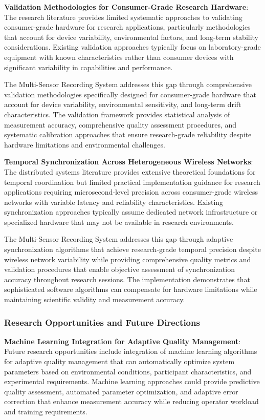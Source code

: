 \documentclass[11pt,a4paper]{report}
\begin{document}
\textbf{Validation Methodologies for Consumer-Grade Research Hardware}: The research literature provides limited systematic
approaches to validating consumer-grade hardware for research applications, particularly methodologies that account for
device variability, environmental factors, and long-term stability considerations. Existing validation approaches
typically focus on laboratory-grade equipment with known characteristics rather than consumer devices with significant
variability in capabilities and performance.

The Multi-Sensor Recording System addresses this gap through comprehensive validation methodologies specifically
designed for consumer-grade hardware that account for device variability, environmental sensitivity, and long-term drift
characteristics. The validation framework provides statistical analysis of measurement accuracy, comprehensive quality
assessment procedures, and systematic calibration approaches that ensure research-grade reliability despite hardware
limitations and environmental challenges.

\textbf{Temporal Synchronization Across Heterogeneous Wireless Networks}: The distributed systems literature provides
extensive theoretical foundations for temporal coordination but limited practical implementation guidance for research
applications requiring microsecond-level precision across consumer-grade wireless networks with variable latency and
reliability characteristics. Existing synchronization approaches typically assume dedicated network infrastructure or
specialized hardware that may not be available in research environments.

The Multi-Sensor Recording System addresses this gap through adaptive synchronization algorithms that achieve
research-grade temporal precision despite wireless network variability while providing comprehensive quality metrics and
validation procedures that enable objective assessment of synchronization accuracy throughout research sessions. The
implementation demonstrates that sophisticated software algorithms can compensate for hardware limitations while
maintaining scientific validity and measurement accuracy.

\subsubsection{Research Opportunities and Future Directions}

\textbf{Machine Learning Integration for Adaptive Quality Management}: Future research opportunities include integration of
machine learning algorithms for adaptive quality management that can automatically optimize system parameters based on
environmental conditions, participant characteristics, and experimental requirements. Machine learning approaches could
provide predictive quality assessment, automated parameter optimization, and adaptive error correction that enhance
measurement accuracy while reducing operator workload and training requirements.
\end{document}
